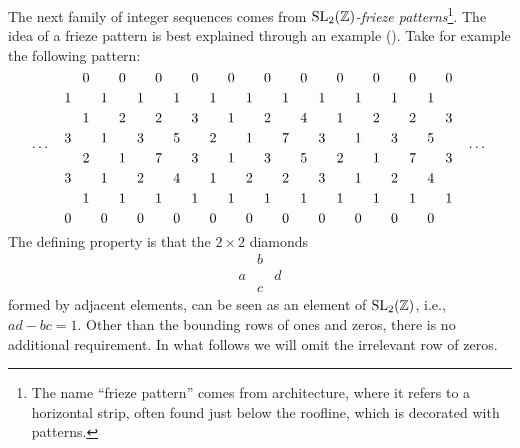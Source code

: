 \begin{example}\label{exmp:frieze_patterns}

	The next family of integer sequences comes from \emph{$\operatorname{SL}_2(\mathbb{Z})$-frieze
		patterns}\footnote{The name ``frieze pattern'' comes from architecture, where it refers
		to a horizontal strip, often found just below the roofline, which is decorated with
		patterns.}. The idea of a frieze
	pattern is best explained through an example (\cite{Coxeter1971FriezePatterns}). Take
	for example the following pattern:
	\begin{equation*}
		\dots\quad
		\begin{tikzcd}[
				sep = 0.2em, cramped,
			]
			&0&&0&&0&&0&&0&&0&&0&&0&&0&&0&&0\\
			1&&1&&1&&1&&1&&1&&1&&1&&1&&1&&1\\
			&1&&2&&2&&3&&1&&2&&4&&1&&2&&2&&3\\
			3&&1&&3&&5&&2&&1&&7&&3&&1&&3&&5\\
			&2&&1&&7&&3&&1&&3&&5&&2&&1&&7&&3\\
			3&&1&&2&&4&&1&&2&&2&&3&&1&&2&&4\\
			&1&&1&&1&&1&&1&&1&&1&&1&&1&&1&&1\\
			0&&0&&0&&0&&0&&0&&0&&0&&0&&0&&0
		\end{tikzcd}
		\quad
		\dots
	\end{equation*}
	The defining property is that the $2 \times 2$ diamonds
	\begin{equation*}
		\begin{matrix}
			  & b &   \\
			a &   & d \\
			  & c &
		\end{matrix}
	\end{equation*}
	formed by adjacent elements, can be seen as an element of $\operatorname{SL}_2 (\mathbb{Z})$, i.e., $ad - bc = 1$. Other than the bounding rows of ones and zeros, there is no additional requirement. In what follows we will omit the irrelevant row of zeros.


\end{example}
